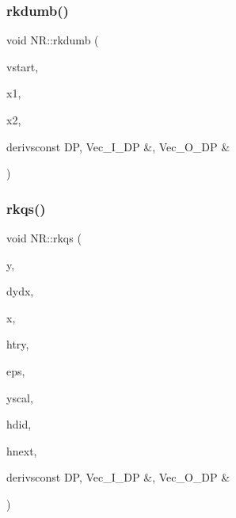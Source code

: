 \mbox{\label{namespaceNR_a46a7b57fd403c001f40f08a0b71abc57}} 
\subsubsection{\texorpdfstring{rkdumb()}{rkdumb()}}
{\footnotesize\ttfamily void N\+R\+::rkdumb (\begin{DoxyParamCaption}\item[{\mbox{\hyperlink{namespaceNR_a9f943da53862537c552e2a770cb170ae}{Vec\+\_\+\+I\+\_\+\+DP}} \&}]{vstart,  }\item[{const \mbox{\hyperlink{namespaceNR_af6ff762dd605ff477b8e52387253a02a}{DP}}}]{x1,  }\item[{const \mbox{\hyperlink{namespaceNR_af6ff762dd605ff477b8e52387253a02a}{DP}}}]{x2,  }\item[{void }]{derivsconst D\+P, Vec\+\_\+\+I\+\_\+\+D\+P \&, Vec\+\_\+\+O\+\_\+\+D\+P \& }\end{DoxyParamCaption})}

\mbox{\label{namespaceNR_a07b7b00335709107b531436f32a7cdd8}} 
\subsubsection{\texorpdfstring{rkqs()}{rkqs()}}
{\footnotesize\ttfamily void N\+R\+::rkqs (\begin{DoxyParamCaption}\item[{\mbox{\hyperlink{namespaceNR_ab293e06a6bf799d8a7ed932b6852bcb8}{Vec\+\_\+\+I\+O\+\_\+\+DP}} \&}]{y,  }\item[{\mbox{\hyperlink{namespaceNR_ab293e06a6bf799d8a7ed932b6852bcb8}{Vec\+\_\+\+I\+O\+\_\+\+DP}} \&}]{dydx,  }\item[{\mbox{\hyperlink{namespaceNR_af6ff762dd605ff477b8e52387253a02a}{DP}} \&}]{x,  }\item[{const \mbox{\hyperlink{namespaceNR_af6ff762dd605ff477b8e52387253a02a}{DP}}}]{htry,  }\item[{const \mbox{\hyperlink{namespaceNR_af6ff762dd605ff477b8e52387253a02a}{DP}}}]{eps,  }\item[{\mbox{\hyperlink{namespaceNR_a9f943da53862537c552e2a770cb170ae}{Vec\+\_\+\+I\+\_\+\+DP}} \&}]{yscal,  }\item[{\mbox{\hyperlink{namespaceNR_af6ff762dd605ff477b8e52387253a02a}{DP}} \&}]{hdid,  }\item[{\mbox{\hyperlink{namespaceNR_af6ff762dd605ff477b8e52387253a02a}{DP}} \&}]{hnext,  }\item[{void }]{derivsconst D\+P, Vec\+\_\+\+I\+\_\+\+D\+P \&, Vec\+\_\+\+O\+\_\+\+D\+P \& }\end{DoxyParamCaption})}

